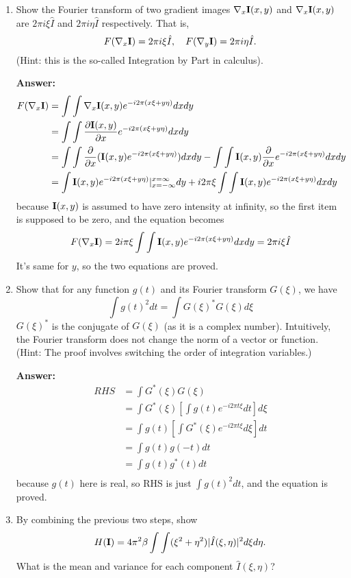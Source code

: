\documentclass[11pt]{article}
\newcommand{\I}{{\bf I}}
\begin{document}
\begin{enumerate}
\item Show the Fourier transform of two gradient images
$\nabla_x\I(x,y)$ and $\nabla_x\I(x,y)$ are $2\pi i \xi \hat{I}$ and
$2\pi i \eta \hat{I}$ respectively.  That is,
\[
   F(\nabla_x\I) = 2\pi i \xi \hat{I}, \quad  F(\nabla_y\I) = 2\pi i \eta \hat{I}.
\]
(Hint: this is the so-called Integration by Part in calculus).

\textbf{Answer:}
$$
\begin{aligned}
	F(\nabla_x \I) & = \int\int \nabla_x \I(x,y) e^{-i2\pi (x \xi + y\eta)} dxdy \\
	& = \int\int \frac{\partial \I(x,y)}{\partial x} e^{-i2\pi (x \xi + y\eta)} dxdy \\
	& = \int\int \frac{\partial }{\partial x} (\I(x,y)e^{-i2\pi (x \xi + y\eta)}) dxdy - \int\int  \I(x,y) \frac{\partial }{\partial x}e^{-i2\pi (x \xi + y\eta)} dxdy \\
	& = \int \I(x,y) e^{-i2\pi(x\xi + y\eta)}|^{x=\infty}_{x=-\infty} dy + i2\pi\xi\int\int \I(x,y)e^{-i2\pi (x \xi + y\eta)}dxdy
\end{aligned}
$$
because $\I(x,y)$ is assumed to have zero intensity at
infinity, so the first item is supposed to be zero, and the equation becomes
$$
 F(\nabla_x \I) = 2i\pi\xi \int\int \I(x,y)e^{-i2\pi (x \xi + y\eta)}dxdy = 2\pi i \xi \hat{I}
$$
It's same for $y$, so the two equations are proved.

\item Show that for any function $g(t)$ and its Fourier transform $G(\xi)$, we have
\[
      \int g(t)^2 dt = \int G(\xi)^\ast G(\xi) d\xi
\]
$G(\xi)^\ast$ is the conjugate of $G(\xi)$ (as it is a complex number). Intuitively, the Fourier transform does not change the norm of a vector or function. (Hint: The proof involves switching the order of integration variables.)

\textbf{Answer:}
$$
\begin{aligned}
	RHS & = \int G^*(\xi)G(\xi) \\
	& = \int G^*(\xi)\left[\int g(t)e^{-i2\pi t\xi}dt\right]d\xi \\
	& = \int g(t) \left[\int G^*(\xi)e^{-i2\pi t\xi}d\xi\right]dt \\
	& = \int g(t)g(-t)dt \\
	& = \int g(t)g^*(t)dt \\
\end{aligned}
$$
because $g(t)$ here is real, so RHS is just $\int g(t)^2 dt$, and the equation is proved.
\item By combining the previous two steps, show
\[
       H(\I) = 4 \pi^2 \beta \int\int (\xi^2 + \eta^2)
       |\hat{I}(\xi,\eta)|^2 d\xi d\eta.
\]
What is the mean and variance for each component $\hat{I}(\xi,\eta)$?


\end{enumerate}
\end{document}
